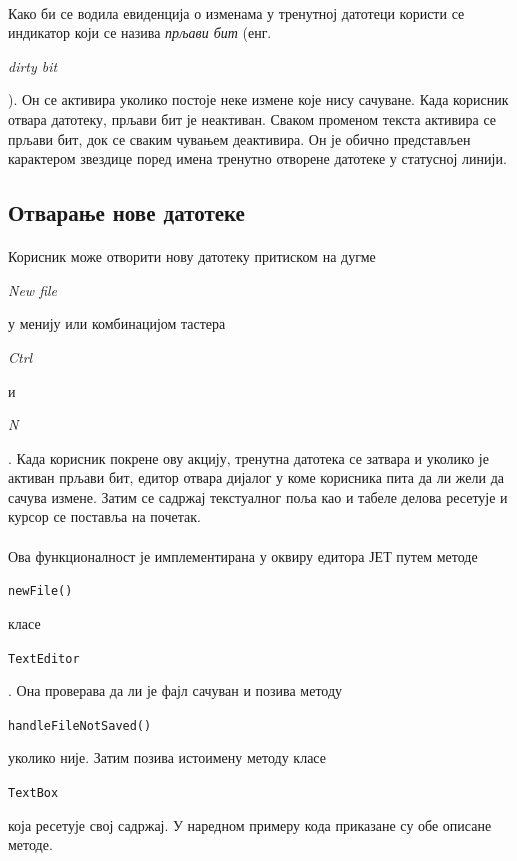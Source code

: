 \documentclass[12pt,oneside]{memoir}
\begin{document}
\paragraph{}
Како би се водила евиденција о изменама у тренутној датотеци користи
се индикатор који се назива \emph{прљави бит} (енг. \begin{latinica}\textit{dirty bit}\end{latinica}). Он се активира уколико постоје неке измене које нису сачуване.
Када корисник отвара датотеку, прљави бит је неактиван.
Сваком променом текста активира се прљави бит, док се сваким
чувањем деактивира. Он је обично представљен карактером звездице поред
имена тренутно отворене датотеке у статусној линији.

\subsection{Отварање нове датотеке}
\paragraph{}
Корисник може отворити нову датотеку притиском на дугме 
\begin{latinica}\textit{New file}\end{latinica} у менију или комбинацијом тастера
\begin{latinica}\textit{Ctrl}\end{latinica} и
\begin{latinica}\textit{N}\end{latinica}. Када корисник покрене ову акцију,
тренутна датотека се затвара и уколико је активан прљави бит, едитор отвара
дијалог у коме корисника пита да ли жели да сачува измене. Затим се садржај
текстуалног поља као и табеле делова ресетује и курсор се поставља на почетак.

\paragraph{}
Ова функционалност је имплементирана у оквиру едитора ЈЕТ путем методе
\begin{latinica}\verb|newFile()|\end{latinica} класе
\begin{latinica}\verb|TextEditor|\end{latinica}. Она проверава да ли је фајл
сачуван и позива методу
\begin{latinica}\verb|handleFileNotSaved()|\end{latinica} 
уколико није. Затим позива истоимену методу класе \begin{latinica}\verb|TextBox|\end{latinica} која ресетује свој садржај.
У наредном примеру кода приказане су обе описане методе.
\end{document}
